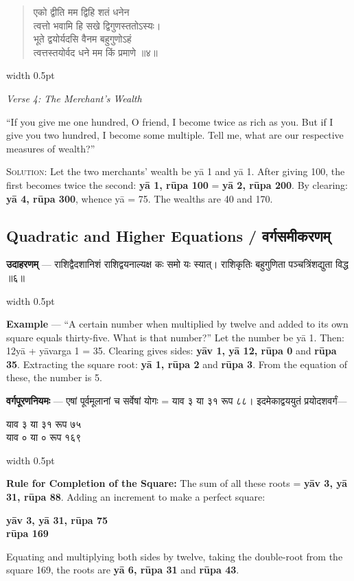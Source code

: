 \documentclass[11pt,a4paper]{article}
\newcommand{\dev}[1]{{\devanagarifont #1}}
\newcommand{\vs}{\vspace{0.5em}}
\newenvironment{sanskritverse}{%
  \begin{quote}\devanagarifont\textcolor{versecolor}%
}{%
  \end{quote}
}
\newcommand{\bilingual}[2]{%
  \par\vspace{0.5em}%
  \noindent\begin{minipage}[t]{0.47\textwidth}%
  \setlength{\parindent}{0pt}%
  \small #1%
  \end{minipage}%
  \hfill\textcolor{columnrule}{\vrule width 0.5pt}\hfill%
  \begin{minipage}[t]{0.47\textwidth}%
  \setlength{\parindent}{0pt}%
  \small\raggedright #2%
  \end{minipage}%
  \par\vspace{0.5em}%
}
\begin{document}
\vs

\bilingual{\begin{sanskritverse}
एको द्वीति मम द्विहि शतं धनेन\\
त्वत्तो भवामि हि सखे द्विगुणस्ततोऽस्यः।\\
भूते द्वयोर्यदसि वैनम बहुगुणोऽहं\\
त्वत्तस्तयोर्वद धने मम किं प्रमाणे ॥४॥
\end{sanskritverse}
}{%
\begin{flushright}
\textit{Verse 4: The Merchant's Wealth}
\end{flushright}
``If you give me one hundred, O friend, I become twice as rich as you. But if I give you two hundred, I become some multiple. Tell me, what are our respective measures of wealth?''

\vs
\textsc{Solution:} Let the two merchants' wealth be y\={a} 1 and y\={a} 1. After giving 100, the first becomes twice the second: \textbf{y\={a} 1, r\={u}pa 100} = \textbf{y\={a} 2, r\={u}pa 200}. By clearing: \textbf{y\={a} 4, r\={u}pa 300}, whence y\={a} = 75. The wealths are 40 and 170.}

\newpage

\subsection*{Quadratic and Higher Equations / वर्गसमीकरणम्}

\bilingual{\textbf{उदाहरणम्} — राशिद्वैदशानिशं राशिद्वयनाल्यक्ष कः समो यः स्यात्। राशिकृतिः बहुगुणिता पञ्चत्रिंशद्युता विद्ध ॥६॥
}{%
\textbf{Example} --- ``A certain number when multiplied by twelve and added to its own square equals thirty-five. What is that number?'' Let the number be y\={a} 1. Then: 12y\={a} + y\={a}varga 1 = 35. Clearing gives sides: \textbf{y\={a}v 1, y\={a} 12, r\={u}pa 0} and \textbf{r\={u}pa 35}. Extracting the square root: \textbf{y\={a} 1, r\={u}pa 2} and \textbf{r\={u}pa 3}. From the equation of these, the number is 5.}

\vs

\bilingual{\textbf{वर्गपूरणनियमः} — एषां पूर्वमूलानां च सर्वेषां योगः = \dev{याव ३ या ३१ रूप ८८}। इदमेकाद्वययुतं प्रयोदशवर्गं—
\begin{center}\dev{याव ३ या ३१ रूप ७५}\\\dev{याव ० या ० रूप १६९}\end{center}
}{%
\textbf{Rule for Completion of the Square:} The sum of all these roots = \textbf{y\={a}v 3, y\={a} 31, r\={u}pa 88}. Adding an increment to make a perfect square:
\begin{center}\textbf{y\={a}v 3, y\={a} 31, r\={u}pa 75}\\\textbf{r\={u}pa 169}\end{center}
Equating and multiplying both sides by twelve, taking the double-root from the square 169, the roots are \textbf{y\={a} 6, r\={u}pa 31} and \textbf{r\={u}pa 43}.}
\end{document}
